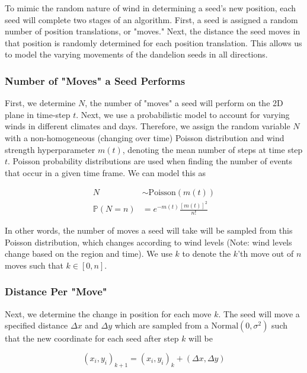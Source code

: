 To mimic the random nature of wind in determining a seed's new position, each seed will complete two stages of an algorithm. First, a seed is assigned a random number of position translations, or "moves." Next, the distance the seed moves in that position is randomly determined for each position translation. This allows us to model the varying movements of the dandelion seeds in all directions.

\subsubsection{Number of "Moves" a Seed Performs}
    First, we determine \(N\), the number of "moves" a seed will perform on the 2D plane in time-step \(t\). Next, we use a probabilistic model to account for varying winds in different climates and days. Therefore, we assign the random variable \(N\) with a non-homogeneous (changing over time) Poisson distribution and wind strength hyperparameter \(m(t)\), denoting the mean number of steps at time step \(t\). Poisson probability distributions are used when finding the number of events that occur in a given time frame. We can model this as 

    \begin{align}
        N & \sim \text{Poisson}(m(t)) \\
        \mathbb{P}(N=n) & = e^{-m(t)}\frac{\left[m(t)\right]^2}{n!} \nonumber
    \end{align}

    In other words, the number of moves a seed will take will be sampled from this Poisson distribution, which changes according to wind levels (Note: wind levels change based on the region and time). We use \(k\) to denote the \(k\)'th move out of \(n\) moves such that \(k \in [0, n]\).

\subsubsection{Distance Per "Move"}

    Next, we determine the change in position for each move \(k\). The seed will move a specified distance \(\Delta x\) and \(\Delta y\) which are sampled from a \(\text{Normal} (0, \sigma^2)\) such that the new coordinate for each seed after step \(k\) will be 

    \begin{equation}
        (x_i, y_i)_{k+1} = (x_i, y_i)_k + (\Delta x, \Delta y)
    \end{equation}

